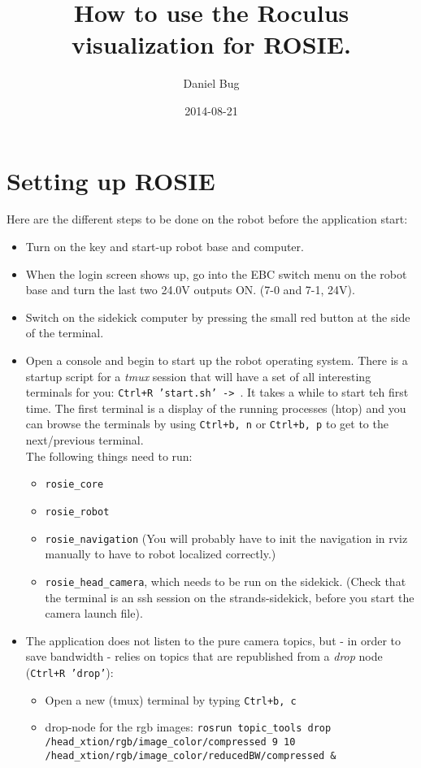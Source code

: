 \documentclass[a4paper, 12pt]{article}
\title{How to use the Roculus visualization for ROSIE.}
\date{2014-08-21}
\author{Daniel Bug}
\begin{document}
\maketitle

\section{Setting up ROSIE}
Here are the different steps to be done on the robot before the application start:
\begin{itemize}
\item Turn on the key and start-up robot base and computer.
\item When the login screen shows up, go into the EBC switch menu on the robot base and turn the last two 24.0V outputs ON. (7-0 and 7-1, 24V).
\item Switch on the sidekick computer by pressing the small red button at the side of the terminal.
\item Open a console and begin to start up the robot operating system. There is a startup script for a \emph{tmux} session that will have a set of all interesting terminals for you: \texttt{Ctrl+R 'start.sh' -> }. It takes a while to start teh first time. The first terminal is a display of the running processes (htop) and you can browse the terminals by using \texttt{Ctrl+b, n} or \texttt{Ctrl+b, p} to get to the next/previous terminal.\\ The following things need to run:
  \begin{itemize}
  \item \texttt{rosie\_core}
  \item \texttt{rosie\_robot}
  \item \texttt{rosie\_navigation} (You will probably have to init the navigation in rviz manually to have to robot localized correctly.)
  \item \texttt{rosie\_head\_camera}, which needs to be run on the sidekick. (Check that the terminal is an ssh session on the strands-sidekick, before you start the camera launch file).
  \end{itemize}
\item The application does not listen to the pure camera topics, but - in order to save bandwidth - relies on topics that are republished from a \emph{drop} node (\texttt{Ctrl+R 'drop'}):
  \begin{itemize}
  \item Open a new (tmux) terminal by typing \texttt{Ctrl+b, c}
  \item drop-node for the rgb images: \texttt{rosrun topic\_tools drop \\/head\_xtion/rgb/image\_color/compressed 9 10 \\/head\_xtion/rgb/image\_color/reducedBW/compressed \&}

\end{itemize}
\end{itemize}
\end{document}
